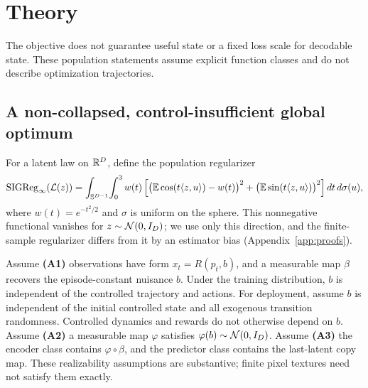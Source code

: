\section{Theory}
\label{sec:theory}

The objective does not guarantee useful state or a fixed loss scale for decodable state.
These population statements assume explicit function classes and do not describe optimization trajectories.

\subsection{A non-collapsed, control-insufficient global optimum}
\label{sec:theory-rep}

For a latent law on $\mathbb{R}^D$, define the population regularizer
\begin{equation}
\label{eq:popsigreg}
\mathrm{SIGReg}_\infty(\mathcal L(z))=
\int_{\mathbb S^{D-1}}\!\int_0^3 w(t)
\left[\big(\mathbb{E}\cos(t\langle z,u\rangle)-w(t)\big)^2
+\big(\mathbb{E}\sin(t\langle z,u\rangle)\big)^2\right]dt\,d\sigma(u),
\end{equation}
where $w(t)=e^{-t^2/2}$ and $\sigma$ is uniform on the sphere.
This nonnegative functional vanishes for $z\sim\mathcal{N}(0,I_D)$; we use only this direction, and the
finite-sample regularizer differs from it by an estimator bias (Appendix~\ref{app:proofs}).

Assume \textbf{(A1)} observations have form $x_t=R(p_t,b)$, and a measurable map $\beta$ recovers the episode-constant nuisance $b$.
Under the training distribution, $b$ is independent of the controlled trajectory and actions.
For deployment, assume $b$ is independent of the initial controlled state and all exogenous transition randomness.
Controlled dynamics and rewards do not otherwise depend on $b$.
Assume \textbf{(A2)} a measurable map $\varphi$ satisfies $\varphi(b)\sim\mathcal{N}(0,I_D)$.
Assume \textbf{(A3)} the encoder class contains $\varphi\circ\beta$, and the predictor class contains the last-latent copy map.
These realizability assumptions are substantive; finite pixel textures need not satisfy them exactly.

